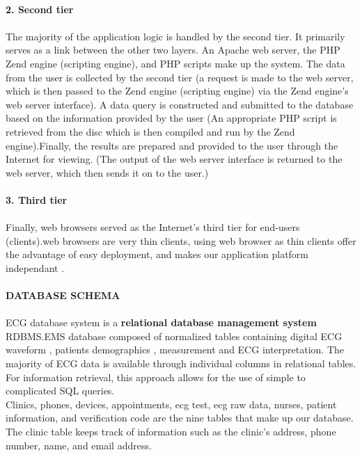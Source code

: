 \documentclass[12pt]{article}
\begin{document}
\paragraph{\textbf{2. Second tier}}
\paragraph{}The majority of the application logic is handled by the second tier. It primarily serves as a link between the other two layers. An Apache web server, the PHP Zend engine (scripting engine), and PHP scripts make up the system. The data from the user is collected by the second tier (a request is made to the web server, which is then passed to the Zend engine (scripting engine) via the Zend engine's web server interface). A data query is constructed and submitted to the database based on the information provided by the user (An appropriate PHP script is retrieved from the disc which is then compiled and run by the Zend engine).Finally, the results are prepared and provided to the user through the Internet for viewing. (The output of the web server interface is returned to the web server, which then sends it on to the user.)
\paragraph{\textbf{3. Third tier}}
\paragraph{} Finally, web browsers served as the
Internet’s third tier for end-users (clients).web browsers are very thin clients, using web browser as thin clients offer the advantage of easy deployment, and makes our application platform independant .
\paragraph{\textbf{DATABASE SCHEMA }}
\paragraph{}ECG database system is a \textbf{relational database management system} RDBMS.EMS database composed of normalized tables containing digital ECG waveform , patients demographics , measurement and ECG interpretation. The majority of ECG data is available through individual columns in relational tables. For information retrieval, this approach allows for the use of simple to complicated SQL queries.\\Clinics, phones, devices, appointments, ecg test, ecg raw data, nurses, patient information, and verification code are the nine tables that make up our database.
The clinic table keeps track of information such as the clinic's address, phone number, name, and email address.
\noindent
\end{document}
